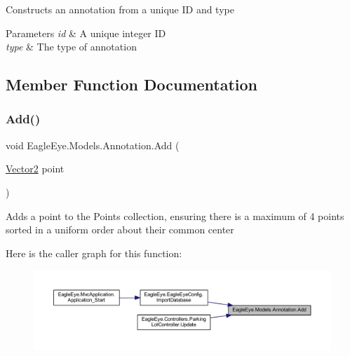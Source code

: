 Constructs an annotation from a unique ID and type 


\begin{DoxyParams}{Parameters}
{\em id} & A unique integer ID\\
\hline
{\em type} & The type of annotation\\
\hline
\end{DoxyParams}


\subsection{Member Function Documentation}
\mbox{\label{class_eagle_eye_1_1_models_1_1_annotation_a47912a5775f0ead932d1cddb43213cd1}} 
\subsubsection{\texorpdfstring{Add()}{Add()}}
{\footnotesize\ttfamily void Eagle\+Eye.\+Models.\+Annotation.\+Add (\begin{DoxyParamCaption}\item[{\mbox{\hyperlink{struct_eagle_eye_1_1_models_1_1_geometry_1_1_vector2}{Vector2}}}]{point }\end{DoxyParamCaption})}



Adds a point to the Points collection, ensuring there is a maximum of 4 points sorted in a uniform order about their common center 

Here is the caller graph for this function\+:\nopagebreak
\begin{figure}[H]
\begin{center}
\leavevmode
\includegraphics[width=350pt]{class_eagle_eye_1_1_models_1_1_annotation_a47912a5775f0ead932d1cddb43213cd1_icgraph}
\end{center}
\end{figure}
\mbox{\label{class_eagle_eye_1_1_models_1_1_annotation_afa6be3269640630b76dce0c9dee1a239}} 
